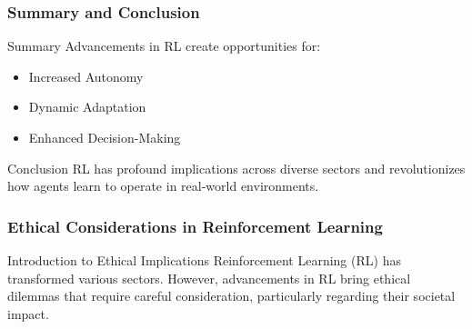 \documentclass[aspectratio=169]{beamer}
\begin{document}
\begin{frame}[fragile]
    \frametitle{Summary and Conclusion}
    \begin{block}{Summary}
        Advancements in RL create opportunities for:
        \begin{itemize}
            \item Increased Autonomy
            \item Dynamic Adaptation
            \item Enhanced Decision-Making
        \end{itemize}
    \end{block}
    \begin{block}{Conclusion}
        RL has profound implications across diverse sectors and revolutionizes how agents learn to operate in real-world environments.
    \end{block}
\end{frame}

\begin{frame}
    \frametitle{Ethical Considerations in Reinforcement Learning}
    \begin{block}{Introduction to Ethical Implications}
        Reinforcement Learning (RL) has transformed various sectors. However, advancements in RL bring ethical dilemmas that require careful consideration, particularly regarding their societal impact.
    \end{block}
\end{frame}
\end{document}
